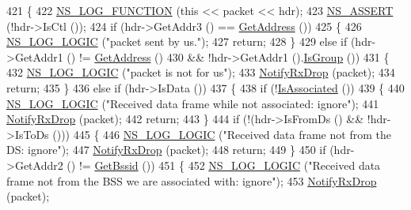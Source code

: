 \begin{DoxyCode}
421 \{
422   \hyperlink{log-macros-disabled_8h_a90b90d5bad1f39cb1b64923ea94c0761}{NS\_LOG\_FUNCTION} (\textcolor{keyword}{this} << packet << hdr);
423   \hyperlink{assert_8h_a6dccdb0de9b252f60088ce281c49d052}{NS\_ASSERT} (!hdr->IsCtl ());
424   \textcolor{keywordflow}{if} (hdr->GetAddr3 () == \hyperlink{classns3_1_1RegularWifiMac_aea719a7d05fbc664c50479fc900777b7}{GetAddress} ())
425     \{
426       \hyperlink{group__logging_ga88acd260151caf2db9c0fc84997f45ce}{NS\_LOG\_LOGIC} (\textcolor{stringliteral}{"packet sent by us."});
427       \textcolor{keywordflow}{return};
428     \}
429   \textcolor{keywordflow}{else} \textcolor{keywordflow}{if} (hdr->GetAddr1 () != \hyperlink{classns3_1_1RegularWifiMac_aea719a7d05fbc664c50479fc900777b7}{GetAddress} ()
430            && !hdr->GetAddr1 ().\hyperlink{classns3_1_1Mac48Address_ae191b13b8ecd9d138c2301483ab826e8}{IsGroup} ())
431     \{
432       \hyperlink{group__logging_ga88acd260151caf2db9c0fc84997f45ce}{NS\_LOG\_LOGIC} (\textcolor{stringliteral}{"packet is not for us"});
433       \hyperlink{classns3_1_1WifiMac_acc2ef3079b2a6ac4fb3838608e5e1ed4}{NotifyRxDrop} (packet);
434       \textcolor{keywordflow}{return};
435     \}
436   \textcolor{keywordflow}{else} \textcolor{keywordflow}{if} (hdr->IsData ())
437     \{
438       \textcolor{keywordflow}{if} (!\hyperlink{classns3_1_1StaWifiMac_a8579a33f94aed726f149cf5ef783e9b5}{IsAssociated} ())
439         \{
440           \hyperlink{group__logging_ga88acd260151caf2db9c0fc84997f45ce}{NS\_LOG\_LOGIC} (\textcolor{stringliteral}{"Received data frame while not associated: ignore"});
441           \hyperlink{classns3_1_1WifiMac_acc2ef3079b2a6ac4fb3838608e5e1ed4}{NotifyRxDrop} (packet);
442           \textcolor{keywordflow}{return};
443         \}
444       \textcolor{keywordflow}{if} (!(hdr->IsFromDs () && !hdr->IsToDs ()))
445         \{
446           \hyperlink{group__logging_ga88acd260151caf2db9c0fc84997f45ce}{NS\_LOG\_LOGIC} (\textcolor{stringliteral}{"Received data frame not from the DS: ignore"});
447           \hyperlink{classns3_1_1WifiMac_acc2ef3079b2a6ac4fb3838608e5e1ed4}{NotifyRxDrop} (packet);
448           \textcolor{keywordflow}{return};
449         \}
450       \textcolor{keywordflow}{if} (hdr->GetAddr2 () != \hyperlink{classns3_1_1RegularWifiMac_acd1705832e3f4a235c2ca6a84b5a577b}{GetBssid} ())
451         \{
452           \hyperlink{group__logging_ga88acd260151caf2db9c0fc84997f45ce}{NS\_LOG\_LOGIC} (\textcolor{stringliteral}{"Received data frame not from the BSS we are associated with: ignore"});
453           \hyperlink{classns3_1_1WifiMac_acc2ef3079b2a6ac4fb3838608e5e1ed4}{NotifyRxDrop} (packet);

\end{DoxyCode}
